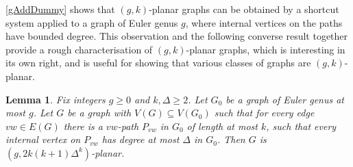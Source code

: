 \documentclass{patmorin}
\theoremstyle{plain}
\newtheorem{lem}[thm]{Lemma}
\theoremstyle{definition}
\renewcommand{\geq}{\geqslant}
\begin{document}
\cref{gAddDummy} shows that $(g,k)$-planar graphs can be obtained by a shortcut system applied to a graph of Euler genus $g$, where internal vertices on the paths have bounded degree. This observation and the following converse result together provide a rough characterisation of $(g,k)$-planar graphs, which is interesting in its own right, and is useful for showing that various classes of graphs are $(g,k)$-planar.

\begin{lem}
	\label{DrawG}
	Fix integers $g\geq 0$ and $k,\Delta\geq 2$.
	Let $G_0$ be a graph of Euler genus at most $g$. Let $G$ be
	a graph with $V(G) \subseteq V(G_0)$ such that for every edge $vw \in
	E(G)$ there is a $vw$-path $P_{vw}$ in $G_0$ of length at most $k$, such
	that every internal vertex on $P_{vw}$ has degree at most $\Delta$ in
	$G_0$. Then $G$ is $(g, 2k(k+1)\Delta^{k} )$-planar.
\end{lem}
\end{document}
